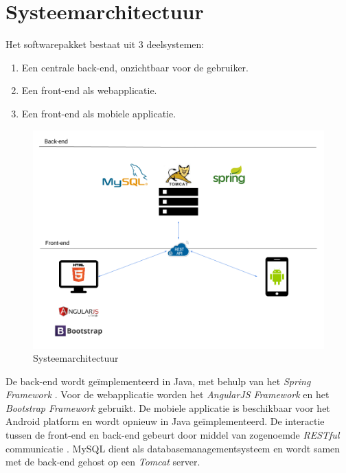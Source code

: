 \documentclass[a4paper]{article}
\begin{document}
\newpage
\section{Systeemarchitectuur}  \label{sec:systeemarchitectuur} %
Het softwarepakket bestaat uit 3 deelsystemen:

\begin{enumerate}
    \item Een centrale back-end, onzichtbaar voor de gebruiker.
    \item Een front-end als webapplicatie.
    \item Een front-end als mobiele applicatie.
\end{enumerate}

\begin{figure}[H]
  \includegraphics[width=\textwidth]{technologie_stack}
  \caption{Systeemarchitectuur}
  \label{fig:Systeemarchitectuur}
\end{figure}

De back-end wordt geïmplementeerd in Java, met behulp van het \textit{Spring Framework} \cite{Spring}. Voor de webapplicatie worden het \textit{AngularJS Framework} \cite{AngularJS} en het \textit{Bootstrap Framework} \cite{Bootstrap} gebruikt. De mobiele applicatie is beschikbaar voor het Android platform en wordt opnieuw in Java geïmplementeerd. De interactie tussen de front-end en back-end gebeurt door middel van zogenoemde \textit{RESTful} communicatie \cite{REST}. MySQL \cite{MySQL} dient als databasemanagementsysteem en wordt samen met de back-end gehost op een \textit{Tomcat} \cite{Tomcat} server.
\end{document}
